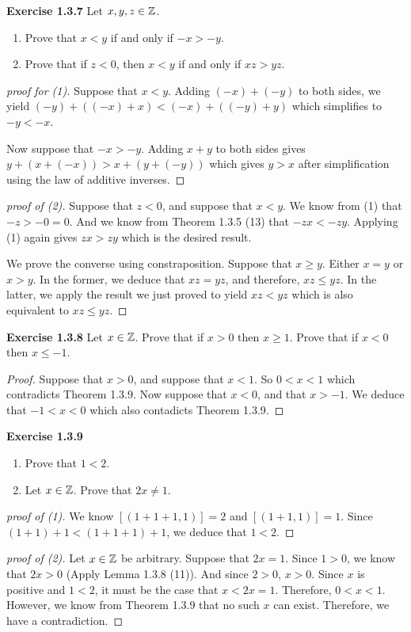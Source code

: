 \noindent \textbf{Exercise 1.3.7} Let \(x,y,z \in \mathbb{Z}\).
\begin{enumerate}
    \item Prove that \(x < y\) if and only if \(-x > -y\).
    \item Prove that if \(z < 0\), then \(x<y\) if and only if \(xz > yz\).
\end{enumerate}
\begin{proof}[proof for (1)]
    Suppose that \(x<y\). Adding \((-x) + (-y)\) to both sides, we yield \((-y) + ((-x) + x) < (-x) + ((-y) + y)\) which simplifies to \(-y < -x\).
    \par Now suppose that \(-x > -y\). Adding \(x + y\) to both sides gives \(y + (x + (-x)) > x + (y + (-y))\) which gives \(y > x\) after simplification using the law of additive inverses.
\end{proof}
\begin{proof}[proof of (2)]
    Suppose that \(z < 0\), and suppose that \(x < y\). We know from (1) that \(-z > -0 = 0\). And we know from Theorem 1.3.5 (13) that \(-zx < -zy\). Applying (1) again gives \(zx > zy\) which is the desired result.
    \par We prove the converse using constraposition. Suppose that \(x \geq y\). Either \(x = y\) or \(x > y\). In the former, we deduce that \(xz = yz\), and therefore, \(xz \leq yz\). In the latter, we apply the result we just proved to yield
    \(xz < yz\) which is also equivalent to \(xz \leq yz\).
\end{proof}


\noindent \textbf{Exercise 1.3.8} Let \(x \in \mathbb{Z}\). Prove that if \(x > 0\) then \(x \geq 1\).
Prove that if \(x < 0\) then \(x \leq -1\).
\begin{proof}
    Suppose that \(x > 0\), and suppose that \(x < 1\). So \(0 < x < 1\) which contradicts Theorem 1.3.9. Now suppose that \(x < 0\), and that \(x > -1\).
    We deduce that \(-1 < x < 0\) which also contadicts Theorem 1.3.9.
\end{proof}



\noindent \textbf{Exercise 1.3.9}
\begin{enumerate}
    \item Prove that \(1 < 2\).
    \item Let \(x \in \mathbb{Z}\). Prove that \(2x \neq 1\).
\end{enumerate}
\begin{proof}[proof of (1)]
    We know \([(1+1+1, 1)] = 2\) and \([(1+1, 1)] = 1\). Since \((1+1) + 1 < (1+1+1) + 1\), we deduce that \(1 < 2\).
\end{proof}
\begin{proof}[proof of (2)]
    Let \(x \in \mathbb{Z}\) be arbitrary. Suppose that \(2x = 1\). Since \(1 > 0\), we know that \(2x > 0\) (Apply Lemma 1.3.8 (11)). And since \(2 > 0\), \(x > 0\).
    Since \(x\) is positive and \(1 < 2\), it must be the case that \(x < 2x = 1\). Therefore, \(0 < x < 1\). However, we know from Theorem 1.3.9 that no such \(x\) can exist. Therefore, we have a contradiction.
\end{proof}



